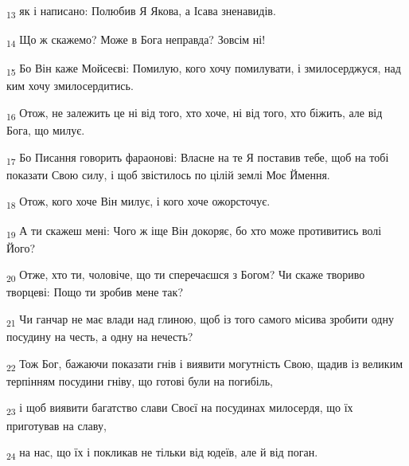 \begin{tcolorbox}
\textsubscript{13} як і написано: Полюбив Я Якова, а Ісава зненавидів.
\end{tcolorbox}
\begin{tcolorbox}
\textsubscript{14} Що ж скажемо? Може в Бога неправда? Зовсім ні!
\end{tcolorbox}
\begin{tcolorbox}
\textsubscript{15} Бо Він каже Мойсеєві: Помилую, кого хочу помилувати, і змилосерджуся, над ким хочу змилосердитись.
\end{tcolorbox}
\begin{tcolorbox}
\textsubscript{16} Отож, не залежить це ні від того, хто хоче, ні від того, хто біжить, але від Бога, що милує.
\end{tcolorbox}
\begin{tcolorbox}
\textsubscript{17} Бо Писання говорить фараонові: Власне на те Я поставив тебе, щоб на тобі показати Свою силу, і щоб звістилось по цілій землі Моє Ймення.
\end{tcolorbox}
\begin{tcolorbox}
\textsubscript{18} Отож, кого хоче Він милує, і кого хоче ожорсточує.
\end{tcolorbox}
\begin{tcolorbox}
\textsubscript{19} А ти скажеш мені: Чого ж іще Він докоряє, бо хто може противитись волі Його?
\end{tcolorbox}
\begin{tcolorbox}
\textsubscript{20} Отже, хто ти, чоловіче, що ти сперечаєшся з Богом? Чи скаже твориво творцеві: Пощо ти зробив мене так?
\end{tcolorbox}
\begin{tcolorbox}
\textsubscript{21} Чи ганчар не має влади над глиною, щоб із того самого місива зробити одну посудину на честь, а одну на нечесть?
\end{tcolorbox}
\begin{tcolorbox}
\textsubscript{22} Тож Бог, бажаючи показати гнів і виявити могутність Свою, щадив із великим терпінням посудини гніву, що готові були на погибіль,
\end{tcolorbox}
\begin{tcolorbox}
\textsubscript{23} і щоб виявити багатство слави Своєї на посудинах милосердя, що їх приготував на славу,
\end{tcolorbox}
\begin{tcolorbox}
\textsubscript{24} на нас, що їх і покликав не тільки від юдеїв, але й від поган.
\end{tcolorbox}
